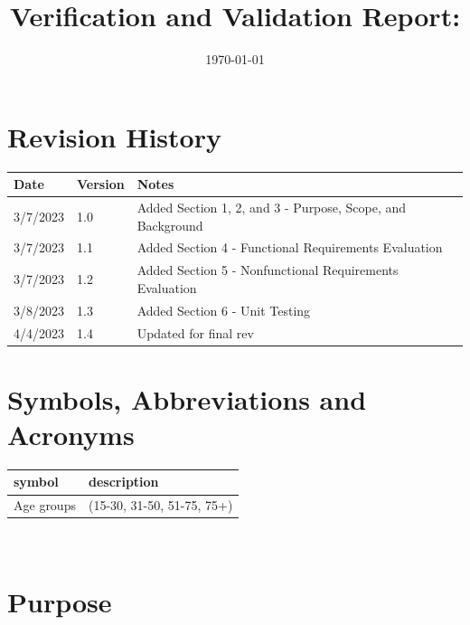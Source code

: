 \documentclass[12pt, titlepage]{article}
\begin{document}
\title{Verification and Validation Report: \progname} 
\author{\authname}
\date{\today}
	
\maketitle


\section*{Revision History}

\begin{tabularx}{\textwidth}{p{3cm}p{2cm}X}
\toprule {\bf Date} & {\bf Version} & {\bf Notes}\\
\midrule
3/7/2023 & 1.0 & Added Section 1, 2, and 3 - Purpose, Scope, and Background\\
3/7/2023 & 1.1 & Added Section 4 - Functional Requirements Evaluation\\
3/7/2023 & 1.2 & Added Section 5 - Nonfunctional Requirements Evaluation\\
3/8/2023 & 1.3 & Added Section 6 - Unit Testing\\
4/4/2023 & 1.4 & Updated for final rev\\
\bottomrule
\end{tabularx}

\newpage

\tableofcontents

\listoffigures

\listoftables

\newpage

\section*{Symbols, Abbreviations and Acronyms}


\renewcommand{\arraystretch}{1.2}
\begin{tabular}{l l} 
  \toprule		
  \textbf{symbol} & \textbf{description}\\
  \midrule 
  Age groups & (15-30, 31-50, 51-75, 75+)\\
  \bottomrule
\end{tabular}\\

\newpage


\section{Purpose}
\end{document}
